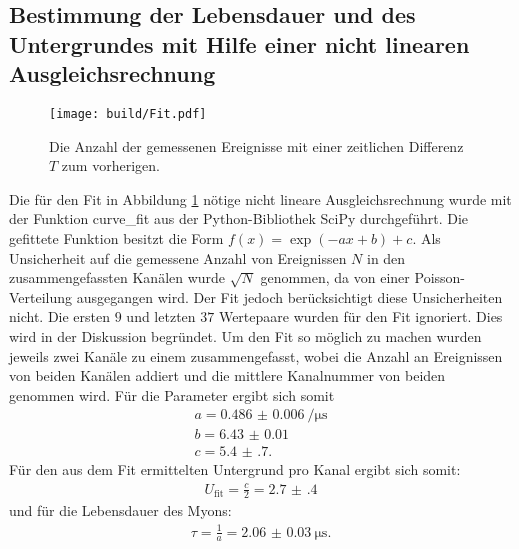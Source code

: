 \subsection{Bestimmung der Lebensdauer und des Untergrundes mit Hilfe einer nicht linearen Ausgleichsrechnung}
\label{subsec:Ausgleichs}
\begin{figure}
	\centering
	\texttt{[image: build/Fit.pdf]}
	\caption{Die Anzahl der gemessenen Ereignisse mit einer zeitlichen Differenz $T$ zum vorherigen.}
	\label{fig:zweite}
\end{figure}
Die für den Fit in Abbildung \ref{fig:zweite} nötige nicht lineare Ausgleichsrechnung wurde mit der Funktion curve\_fit aus der Python-Bibliothek SciPy \cite{scipy} durchgeführt. Die gefittete Funktion besitzt die Form $f(x)=\exp(-a x +b)+c$. Als Unsicherheit auf die gemessene Anzahl von Ereignissen $N$ in den zusammengefassten Kanälen wurde $\sqrt{N}$ genommen, da von einer Poisson-Verteilung ausgegangen wird. Der Fit jedoch berücksichtigt diese Unsicherheiten nicht. Die ersten $9$ und letzten $37$ Wertepaare wurden für den Fit ignoriert. Dies wird in der Diskussion begründet. Um den Fit so möglich zu machen wurden jeweils zwei Kanäle zu einem zusammengefasst, wobei die Anzahl an Ereignissen von beiden Kanälen addiert und die mittlere Kanalnummer von beiden genommen wird. %
Für die Parameter ergibt sich somit
\begin{gather*}
a=\SI{0.486(6)}{\per\micro\second}\\
b=\num{6.43(1)}\\
c=\num{5.4(7)}.
\end{gather*}
Für den aus dem Fit ermittelten Untergrund pro Kanal ergibt sich somit:
\begin{gather*}
	U_\text{fit}=\frac{c}{2}=\num{2.7(4)}
\end{gather*}
und für die Lebensdauer des Myons:
\begin{gather*}
	\tau=\frac{1}{a}=\SI{2.06(3)}{\micro\second}.
\end{gather*}
